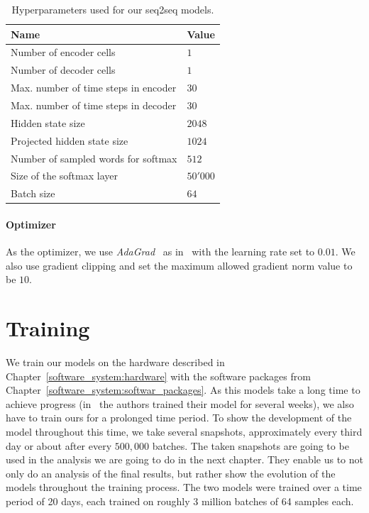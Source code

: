 \begin{table}[H]
	\centering
	\begin{adjustbox}{max width=\textwidth}
		\begin{tabular}{ll}
			\toprule
			Name & Value\\ \midrule
			Number of encoder cells & $1$\\
			Number of decoder cells & $1$\\
			Max. number of time steps in encoder & $30$\\
			Max. number of time steps in decoder & $30$\\
			Hidden state size & $2048$\\
			Projected hidden state size & $1024$\\
			Number of sampled words for softmax & $512$\\
			Size of the softmax layer & $50'000$\\
			Batch size & $64$\\
			\bottomrule
		\end{tabular}
	\end{adjustbox}
	\caption{Hyperparameters used for our seq2seq models.}
	\label{methods:hyperparameters:table}
\end{table}

\paragraph{Optimizer} As the optimizer, we use \emph{AdaGrad}~\cite{Duchi:2011} as in~\cite{Vinyals:2015} with the learning rate set to $0.01$. We also use gradient clipping \cite{Pascanu:2013} and set the maximum allowed gradient norm value to be $10$.

\section{Training}
\label{methods:training}
We train our models on the hardware described in Chapter~\ref{software_system:hardware} with the software packages from Chapter~\ref{software_system:softwar_packages}. As this models take a long time to achieve progress (in~\cite{Vinyals:2015} the authors trained their model for several weeks), we also have to train ours for a prolonged time period. To show the development of the model throughout this time, we take several snapshots, approximately every third day or about after every $500,000$ batches. The taken snapshots are going to be used in the analysis we are going to do in the next chapter. They enable us to not only do an analysis of the final results, but rather show the evolution of the models throughout the training process. The two models were trained over a time period of 20 days, each trained on roughly 3 million batches of 64 samples each.

